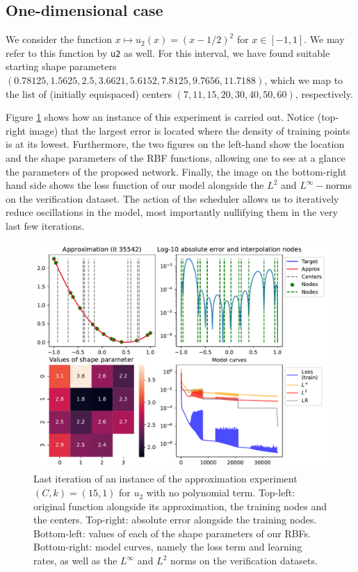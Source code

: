 \documentclass[12pt]{report} %
\begin{document}
\subsection*{One-dimensional case}

We consider the function $x \mapsto u_2(x)=(x-1/2)^2$ for $x \in [-1,1]$. We may refer to this function by \texttt{u2} as well. For this interval, we have found suitable starting shape parameters $(0.78125, 1.5625, 2.5, 3.6621, 5.6152, 7.8125,9.7656,11.7188)$, which we map to the list of (initially equispaced) centers $(7,11,15,20,30,40,50,60)$, respectively.

Figure \ref{u2-example-training-TR15-C15} shows how an instance of this experiment is carried out. Notice (top-right image) that the largest error is located where the density of training points is at its lowest. Furthermore, the two figures on the left-hand show the location and the shape parameters of the RBF functions, allowing one to see at a glance the parameters of the proposed network. Finally, the image on the bottom-right hand side shows the loss function of our model alongside the $L^2$ and $L^\infty-$norms on the verification dataset. The action of the scheduler allows us to iteratively reduce oscillations in the model, most importantly nullifying them in the very last few iterations.

\begin{figure}
  \includegraphics[width=\textwidth]{imagenes/experiments/1d/statistical_1d_full_scheduler_interpolation/u2-TR15-C15-Kgaussian_kernel-Sh2.5-6-E35542.pdf}
  \caption{Last iteration of an instance of the approximation experiment $(C,k)=(15,1)$ for $u_2$ with no polynomial term. Top-left: original function alongside its approximation, the training nodes and the centers. Top-right: absolute error alongside the training nodes. Bottom-left: values of each of the shape parameters of our RBFs. Bottom-right: model curves, namely the loss term and learning rates, as well as the $L^\infty$ and $L^2$ norms on the verification datasets.}
  \label{u2-example-training-TR15-C15}
\end{figure}
\end{document}
